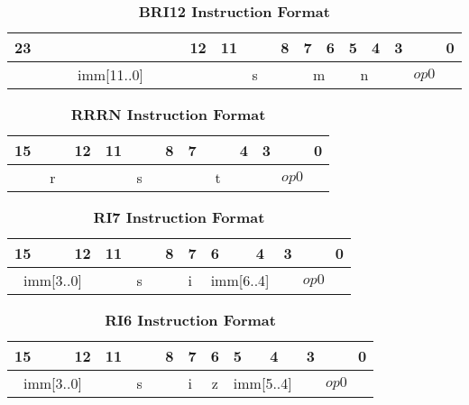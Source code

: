 \begin{table}[H]
	\caption{\textbf{BRI12 Instruction Format}}
	\begin{tabular}{llllllllllllllllllllllll}
		23 & & & & & & & & & & & 12 & 11 & & & 8 & 7 & 6 & 5 & 4 & 3 & & & 0 \\
		\hline
		\multicolumn{12}{|c|}{imm[11..0]} & \multicolumn{4}{c|}{s} & \multicolumn{2}{c|}{m} & \multicolumn{2}{c|}{n} & \multicolumn{4}{c|}{$op0$}\\
		\hline
	\end{tabular}
\end{table}

\begin{table}[H]
	\caption{\textbf{RRRN Instruction Format}}
	\begin{tabular}{llllllllllllllll}
        15 & & & 12 & 11 & & & 8 & 7 &  & & 4 & 3 & & & 0 \\
		\hline
		\multicolumn{4}{|c|}{r} & \multicolumn{4}{c|}{s} & \multicolumn{4}{c|}{t} & \multicolumn{4}{c|}{$op0$}\\
		\hline
	\end{tabular}
\end{table}

\begin{table}[H]
	\caption{\textbf{RI7 Instruction Format}}
	\begin{tabular}{llllllllllllllll}
		15 & & & 12 & 11 & & & 8 & 7 & 6  & & 4 & 3 & & & 0 \\
		\hline
		\multicolumn{4}{|c|}{imm[3..0]} & \multicolumn{4}{c|}{s} & i & \multicolumn{3}{|c|}{imm[6..4]} & \multicolumn{4}{c|}{$op0$}\\
		\hline
	\end{tabular}
\end{table}

\begin{table}[H]
	\caption{\textbf{RI6 Instruction Format}}
	\begin{tabular}{llllllllllllllll}
		15 & & & 12 & 11 & & & 8 & 7 & 6  & 5 & 4 & 3 & & & 0 \\
		\hline
		\multicolumn{4}{|c|}{imm[3..0]} & \multicolumn{4}{c|}{s} & i & \multicolumn{1}{c|}{z} & \multicolumn{2}{c|}{imm[5..4]} & \multicolumn{4}{c|}{$op0$}\\
		\hline
	\end{tabular}
\end{table}